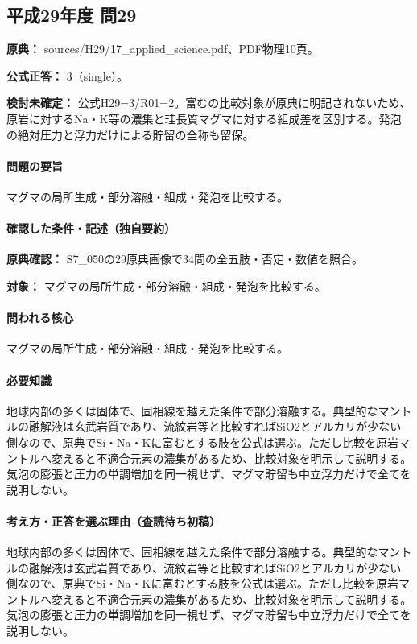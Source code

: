 \subsection{平成29年度 問29}
\label{q:h29-reg-applied-29}

\noindent\textbf{原典：} sources/H29/17\_applied\_science.pdf、PDF物理10頁。

\textbf{公式正答：} 3（single）。

\par\textbf{検討未確定：} 公式H29=\allowbreak{}3/R01=\allowbreak{}2。富むの比較対象が原典に明記されないため、原岩に対するNa・K等の濃集と珪長質マグマに対する組成差を区別する。発泡の絶対圧力と浮力だけによる貯留の全称も留保。

\paragraph{問題の要旨} マグマの局所生成・部分溶融・組成・発泡を比較する。

\paragraph{確認した条件・記述（独自要約）}\mbox{}\par

\noindent\textbf{原典確認：} S7\_050の29原典画像で34問の全五肢・否定・数値を照合。\par

\noindent\textbf{対象：} マグマの局所生成・部分溶融・組成・発泡を比較する。\par

\paragraph{問われる核心} マグマの局所生成・部分溶融・組成・発泡を比較する。

\paragraph{必要知識} 地球内部の多くは固体で、固相線を越えた条件で部分溶融する。典型的なマントルの融解液は玄武岩質であり、流紋岩等と比較すればSiO2とアルカリが少ない側なので、原典でSi・Na・Kに富むとする肢を公式は選ぶ。ただし比較を原岩マントルへ変えると不適合元素の濃集があるため、比較対象を明示して説明する。気泡の膨張と圧力の単調増加を同一視せず、マグマ貯留も中立浮力だけで全てを説明しない。

\paragraph{考え方・正答を選ぶ理由（査読待ち初稿）} 地球内部の多くは固体で、固相線を越えた条件で部分溶融する。典型的なマントルの融解液は玄武岩質であり、流紋岩等と比較すればSiO2とアルカリが少ない側なので、原典でSi・Na・Kに富むとする肢を公式は選ぶ。ただし比較を原岩マントルへ変えると不適合元素の濃集があるため、比較対象を明示して説明する。気泡の膨張と圧力の単調増加を同一視せず、マグマ貯留も中立浮力だけで全てを説明しない。

